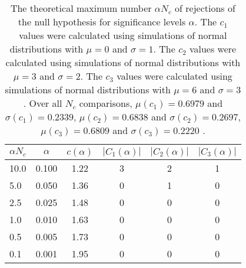 \begin{table}[h!]
\begin{center}
\begin{tabular}{| l | c | c | c | c | c |}\hline
$\alpha N_c$ & $\alpha$ & $c(\alpha)$ & $|C_1(\alpha)|$ & $|C_2(\alpha)|$ & $|C_3(\alpha)|$ \\\hline
10.0 & 0.100 & 1.22 & 3 & 2 & 1 \\\hline
5.0 & 0.050 & 1.36 & 0 & 1 & 0 \\\hline
2.5 & 0.025 & 1.48 & 0 & 0 & 0 \\\hline
1.0 & 0.010 & 1.63 & 0 & 0 & 0 \\\hline
0.5 & 0.005 & 1.73 & 0 & 0 & 0 \\\hline
0.1 & 0.001 & 1.95 & 0 & 0 & 0 \\\hline
\end{tabular}
\caption{The theoretical maximum number $\alpha N_c$ of rejections
of the null hypothesis for significance levels $\alpha$.
The $c_1$ values were calculated using simulations of normal distributions with $\mu=0$ and $\sigma=1$.
The $c_2$ values were calculated using simulations of normal distributions with $\mu=3$ and $\sigma=2$.
The $c_3$ values were calculated using simulations of normal distributions with $\mu=6$ and $\sigma=3$.
Over all $N_c$ comparisons,
 $\mu(c_1)=0.6979$ and $\sigma(c_1)=0.2339$,
 $\mu(c_2)=0.6838$ and $\sigma(c_2)=0.2697$,
 $\mu(c_3)=0.6809$ and $\sigma(c_3)=0.2220$ .
}
\end{center}
\end{table}